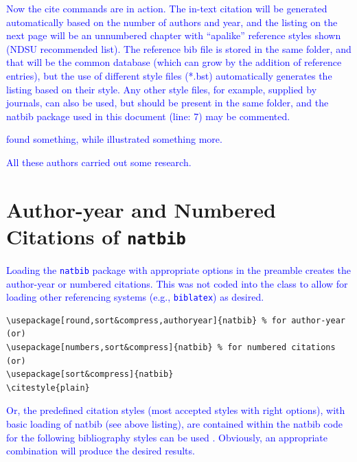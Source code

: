 \documentclass[phd,showframe]{ndsu-thesis-2022}
\newcommand\italk[1]{\textcolor{blue}{#1}}  %
\begin{document}
\italk{Now the cite commands are in action. The in-text citation will be generated automatically based on the number of authors and year, and the listing on the next page will be an unnumbered chapter with ``apalike'' reference styles shown (NDSU recommended list). The reference bib file is stored in the same folder, and that will be the common database (which can grow by the addition of reference entries), but the use of different style files (*.bst) automatically generates the listing based on their style. Any other style files, for example, supplied by journals, can also be used, but should be present in the same folder, and the natbib package used in this document (line: 7) may be commented.}

\italk{\citet{calvo2004using} found something, while \citet{bari2016identification} illustrated something more. }

\italk{All these authors \citep{calvo2004using,cannayen2011latex,bari2016identification,sharma2012ndsu,baczkowski1990ndsu} carried out some research.} 

\section{Author-year and Numbered Citations of \texttt{natbib}}
\italk{Loading the \texttt{natbib} package with appropriate options in the preamble creates the author-year or numbered citations. This was not coded into the class to allow for loading other referencing systems (e.g., \texttt{biblatex}) as desired.}

{\singlespacing
\begin{verbatim}
\usepackage[round,sort&compress,authoryear]{natbib} % for author-year
(or)
\usepackage[numbers,sort&compress]{natbib} % for numbered citations
(or)
\usepackage[sort&compress]{natbib} 
\citestyle{plain}
\end{verbatim}
}

\italk{Or, the predefined citation styles (most accepted styles with right options), with basic loading of natbib (see above listing), are contained within the natbib code for the following bibliography styles can be used \citep{daly2010natural}. Obviously, an appropriate combination will produce the desired results.\\}
\end{document}
